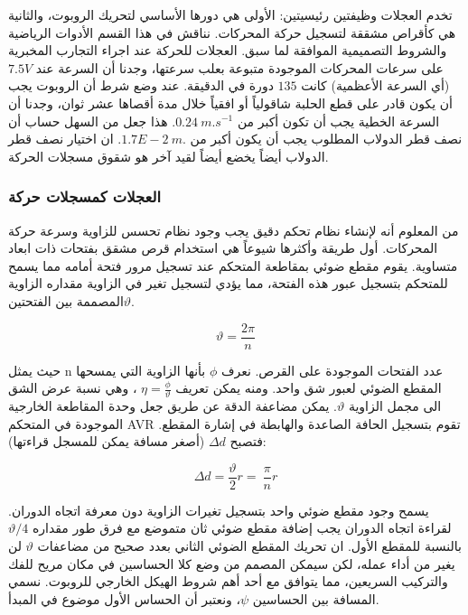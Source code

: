 تخدم العجلات وظيفتين رئيسيتين: الأولى هي دورها الأساسي لتحريك الروبوت، والثانية هي كأقراص مشققة لتسجيل حركة المحركات. نناقش في هذا القسم الأدوات الرياضية والشروط التصميمية الموافقة لما سبق.
العجلات للحركة
عند اجراء التجارب المخبرية على سرعات المحركات الموجودة متبوعة بعلب سرعتها، وجدنا أن السرعة عند $ 7.5 V $ (أي السرعة الأعظمية) كانت $ 135 $ دورة في الدقيقة. عند وضع شرط أن الروبوت يجب أن يكون قادر على قطع الحلبة شاقولياً أو افقياً خلال مدة أقصاها عشر ثوان، وجدنا أن السرعة الخطية يجب أن تكون أكبر من $ 0.24\ m.s^{-1} $. هذا جعل من السهل حساب أن نصف قطر الدولاب المطلوب يجب أن يكون أكبر من $ 1.7E-2\ m.  $. ان اختيار نصف قطر الدولاب أيضاً يخضع أيضاً لقيد آخر هو شقوق مسجلات الحركة.



\subsubsection{العجلات كمسجلات حركة}

من المعلوم أنه لإنشاء نظام تحكم دقيق يجب وجود نظام تحسس للزاوية وسرعة حركة المحركات. أول طريقة وأكثرها شيوعاً هي استخدام قرص مشقق بفتحات ذات ابعاد متساوية. يقوم مقطع ضوئي بمقاطعة المتحكم عند تسجيل مرور فتحة أمامه مما يسمح للمتحكم بتسجيل عبور هذه الفتحة، مما يؤدي لتسجيل تغير في الزاوية مقداره الزاوية المصممة بين الفتحتين$  \vartheta $.

\begin{equation}
	\vartheta=\frac{2\pi}{n}
\end{equation}

حيث يمثل n عدد الفتحات الموجودة على القرص. نعرف $ \phi $ بأنها الزاوية التي يمسحها المقطع الضوئي لعبور شق واحد. ومنه يمكن تعريف $ \eta=\frac{\phi}{\vartheta}$ ، وهي نسبة عرض الشق الى مجمل الزاوية $ \vartheta $. يمكن مضاعفة الدقة عن طريق جعل وحدة المقاطعة الخارجية الموجودة في المتحكم AVR تقوم بتسجيل الحافة الصاعدة والهابطة في إشارة المقطع. فتصبح $  \Delta d $ (أصغر مسافة يمكن للمسجل قراءتها):

\begin{equation}
\Delta d=\frac{\vartheta}{2}r=\ \frac{\pi}{n}r
\end{equation}

يسمح وجود مقطع ضوئي واحد بتسجيل تغيرات الزاوية دون معرفة اتجاه الدوران. لقراءة اتجاه الدوران يجب إضافة مقطع ضوئي ثان متموضع مع فرق طور مقداره $ \vartheta/4  $ بالنسبة للمقطع الأول. ان تحريك المقطع الضوئي الثاني بعدد صحيح من مضاعفات $ \vartheta $ لن يغير من أداء عمله، لكن سيمكن المصمم من وضع كلا الحساسين في مكان مريح للفك والتركيب السريعين، مما يتوافق مع أحد أهم شروط الهيكل الخارجي للروبوت. نسمي المسافة بين الحساسين $  \psi $، ونعتبر أن الحساس الأول موضوع في المبدأ. 

